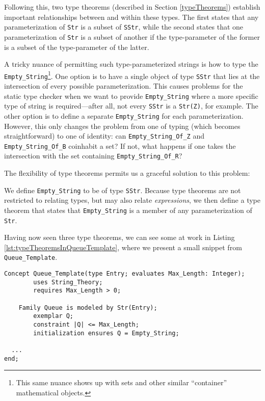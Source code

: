 Following this, two type theorems (described in Section \ref{typeTheorems}) establish important relationships between and within these types.  The first states that any parameterization of \texttt{Str} is a subset of \texttt{SStr}, while the second states that one parameterization of \texttt{Str} is a subset of another if the type-parameter of the former is a subset of the type-parameter of the latter.

A tricky nuance of permitting such type-parameterized strings is how to type the \texttt{Empty\_String}\footnote{This same nuance shows up with sets and other similar ``container'' mathematical objects.}.  One option is to have a single object of type \texttt{SStr} that lies at the intersection of every possible parameterization.   This causes problems for the static type checker when we want to provide \texttt{Empty\_String} where a more specific type of string is required---after all, not every \texttt{SStr} is a \texttt{Str(Z)}, for example.  The other option is to define a separate \texttt{Empty\_String} for each parameterization.  However, this only changes the problem from one of typing (which becomes straightforward) to one of identity: can \texttt{Empty\_String\_Of\_Z} and \texttt{Empty\_String\_Of\_B} coinhabit a set?  If not, what happens if one takes the intersection with the set containing \texttt{Empty\_String\_Of\_R}?

The flexibility of type theorems permits us a graceful solution to this problem:

We define \texttt{Empty\_String} to be of type \texttt{SStr}.  Because type theorems are not restricted to relating types, but may also relate \emph{expressions}, we then define a type theorem that states that \texttt{Empty\_String} is a member of any parameterization of \texttt{Str}.

Having now seen three type theorems, we can see some at work in Listing \ref{lst:typeTheoremsInQueueTemplate}, where we present a small snippet from \texttt{Queue\_Template}.

\begin{lstlisting}[float=h,language=resolve,caption={Type theorems at work in \texttt{Queue\_Template}\label{lst:typeTheoremsInQueueTemplate}}]
Concept Queue_Template(type Entry; evaluates Max_Length: Integer);
		uses String_Theory;
		requires Max_Length > 0;
 
	Family Queue is modeled by Str(Entry);
		exemplar Q;
		constraint |Q| <= Max_Length;
		initialization ensures Q = Empty_String;

  ...
end;
\end{lstlisting}

